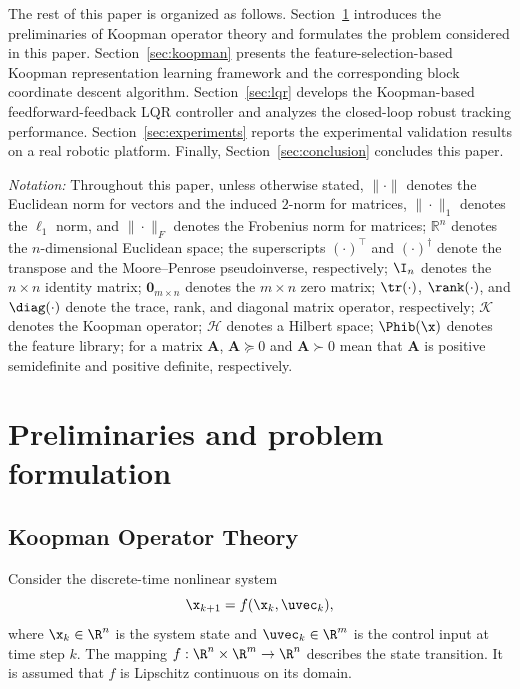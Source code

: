 The rest of this paper is organized as follows. Section~\ref{sec:background}
introduces the preliminaries of Koopman operator theory and formulates the
problem considered in this paper. Section~\ref{sec:koopman} presents the
feature-selection-based Koopman representation learning framework and the
corresponding block coordinate descent algorithm. Section~\ref{sec:lqr}
develops the Koopman-based feedforward-feedback LQR controller and analyzes
the closed-loop robust tracking performance. Section~\ref{sec:experiments}
reports the experimental validation results on a real robotic platform.
Finally, Section~\ref{sec:conclusion} concludes this paper.

\textit{Notation:} Throughout this paper, unless otherwise stated,
$\|\cdot\|$ denotes the Euclidean norm for vectors and the induced $2$-norm
for matrices, $\|\cdot\|_1$ denotes the $\ell_1$ norm, and $\|\cdot\|_F$
denotes the Frobenius norm for matrices; $\mathbb{R}^n$ denotes the
$n$-dimensional Euclidean space; the superscripts $(\cdot)^\top$ and
$(\cdot)^\dagger$ denote the transpose and the Moore--Penrose pseudoinverse,
respectively; $\I_n$ denotes the $n \times n$ identity matrix;
$\mathbf{0}_{m \times n}$ denotes the $m \times n$ zero matrix;
$\tr(\cdot)$, $\rank(\cdot)$, and $\diag(\cdot)$ denote the trace, rank, and
diagonal matrix operator, respectively; $\mathcal{K}$ denotes the Koopman
operator; $\mathcal{H}$ denotes a Hilbert space; $\Phib(\x)$ denotes the
feature library; for a matrix $\mathbf{A}$, $\mathbf{A} \succeq 0$ and
$\mathbf{A} \succ 0$ mean that $\mathbf{A}$ is positive semidefinite and
positive definite, respectively.


\section{Preliminaries and problem formulation}
\label{sec:background}

\subsection{Koopman Operator Theory}
\label{subsec:koopman_theory}

Consider the discrete-time nonlinear system
\begin{equation}
\x_{k+1} = f(\x_k, \uvec_k),
\end{equation}
where $\x_k \in \R^n$ is the system state and $\uvec_k \in \R^m$ is the control input at time step $k$. The mapping $f: \R^n \times \R^m \to \R^n$ describes the state transition. It is assumed that $f$ is Lipschitz continuous on its domain.

